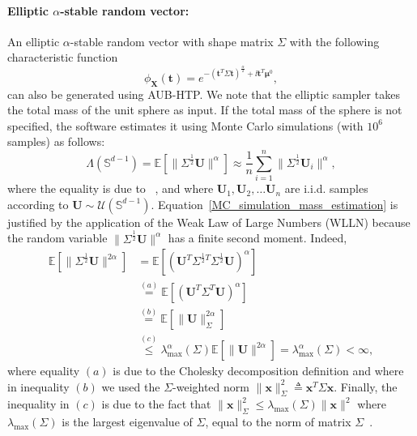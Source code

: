 \paragraph{Elliptic $\alpha$-stable random vector:} An elliptic $\alpha$-stable random vector with shape matrix $\Sigma$ with the following characteristic function
\[
    \phi_{\mathbf{X}}(\mathbf{t})=e^{-(\mathbf{t}^T\Sigma \mathbf{t})^{\frac{\alpha}{2}} +\ii\mathbf{t}^T\boldsymbol{\mu}^0},
\]
can also be generated using AUB-HTP. We note that the elliptic sampler takes the total mass of the unit sphere as input. If the total mass of the sphere is not specified, the software estimates it using Monte Carlo simulations (with $10^6$ samples) as follows:
\begin{equation}
    \label{MC_simulation_mass_estimation}
        \Lambda(\mathbb{S}^{d-1})=\mathbb{E}\left[\|\Sigma^{\frac{1}{2}}\mathbf{U}\|^{\alpha}\right]\approx\frac{1}{n}\sum_{i=1}^n\|\Sigma^{\frac{1}{2}}\mathbf{U}_i\|^{\alpha},
    \end{equation}
where the equality is due to~ \cite[proposition 2.5.8]{SamorodnitskyGennady2000Snrp}, and where  $\mathbf{U}_1,\mathbf{U}_2,\ldots\mathbf{U}_n$ are i.i.d. samples according to $\mathbf{U}\sim\mathcal{U}(\mathbb{S}^{d-1})$. Equation~\eqref{MC_simulation_mass_estimation} is justified by the application of the Weak Law of Large Numbers (WLLN) because the random variable $\|\Sigma^{\frac{1}{2}}\mathbf{U}\|^{\alpha}$ has a finite second moment. Indeed,
\begin{align}
        \mathbb{E}[\|\Sigma^{\frac{1}{2}}\mathbf{U}\|^{2\alpha}]&=\mathbb{E}\left[\left(\mathbf{U}^T\Sigma^{\frac{1}{2}T}\Sigma^{\frac{1}{2}}\mathbf{U}\right)^{\alpha}\right]\nonumber\\&\overset{(a)}=\mathbb{E}\left[\left(\mathbf{U}^T\Sigma^T\mathbf{U}\right)^{\alpha}\right]\label{cholesky}\\
&\overset{(b)}=\mathbb{E}\left[\|\mathbf{U}\|^{2\alpha}_{\Sigma}\right]\label{number}\\&\overset{(c)}\leq \lambda_{\text{max}}^{\alpha}(\Sigma)\mathbb{E}\left[\|\mathbf{U}\|^{2\alpha}\right]=\lambda_{\text{max}}^{\alpha}(\Sigma)<\infty,\label{eq:ineq}
\end{align}
where equality $(a)$ is due to the Cholesky decomposition definition and where in inequality $(b)$ we used the $\Sigma$-weighted norm $\|\mathbf{x}\|^2_{\Sigma}≜\mathbf{x}^T\Sigma\mathbf{x}$. Finally, the inequality in $(c)$ is due to the fact that $\|\mathbf{x}\|^2_{\Sigma}\leq\lambda_{\max}(\Sigma)\|\mathbf{x}\|^2$ where $\lambda_{\text{max}}(\Sigma)$ is the largest eigenvalue of $\Sigma$, equal to the norm of matrix $\Sigma$~\cite{alma991015644117709436}.

